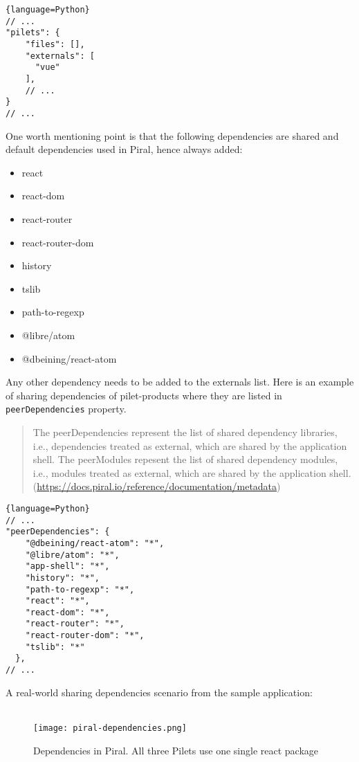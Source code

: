 \documentclass[a4paper]{book}
\begin{document}
\begin{lstlisting}{language=Python}
// ...
"pilets": {
    "files": [],
    "externals": [
      "vue"
    ],
    // ...
}
// ...
\end{lstlisting}
One worth mentioning point is that the following dependencies are shared and default dependencies used in Piral, hence always added:
\begin{itemize}
    \item react
    \item react-dom
    \item react-router
    \item react-router-dom
    \item history
    \item tslib
    \item path-to-regexp
    \item @libre/atom
    \item @dbeining/react-atom
    
\end{itemize}
Any other dependency needs to be added to the externals list.
Here is an example of sharing dependencies of pilet-products where they are listed in \verb|peerDependencies| property.
\begin{quote}
The peerDependencies represent the list of shared dependency libraries, i.e., dependencies treated as external, which are shared by the application shell. The peerModules repesent the list of shared dependency modules, i.e., modules treated as external, which are shared by the application shell. (\url{https://docs.piral.io/reference/documentation/metadata})

\end{quote}
\begin{lstlisting}{language=Python}
// ...
"peerDependencies": {
    "@dbeining/react-atom": "*",
    "@libre/atom": "*",
    "app-shell": "*",
    "history": "*",
    "path-to-regexp": "*",
    "react": "*",
    "react-dom": "*",
    "react-router": "*",
    "react-router-dom": "*",
    "tslib": "*"
  },
// ...
\end{lstlisting}

A real-world sharing dependencies scenario from the sample application:
\\ \\
\begin{figure}[h!]
    \centering
    \captionsetup{justification=centering}
    \texttt{[image: piral-dependencies.png]}
    \caption{Dependencies in Piral. All three Pilets use one single react package}
    \label{fig:4}
\end{figure}
\end{document}
